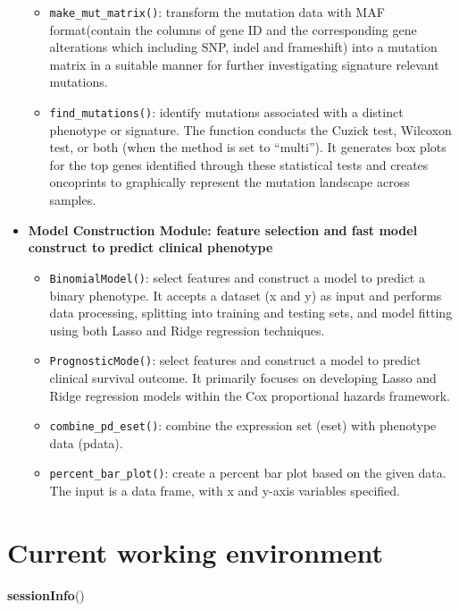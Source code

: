 \documentclass[
  12pt,
]{book}
\newenvironment{Shaded}{\begin{snugshade}}{\end{snugshade}}
\newcommand{\FunctionTok}[1]{\textcolor[rgb]{0.13,0.29,0.53}{\textbf{#1}}}
\newcommand{\NormalTok}[1]{#1}
\providecommand{\tightlist}{%
  \setlength{\itemsep}{0pt}\setlength{\parskip}{0pt}}
\begin{document}
\begin{itemize}
  \begin{itemize}
  \tightlist
  \item
    \texttt{make\_mut\_matrix()}: transform the mutation data with MAF format(contain the columns of gene ID and the corresponding gene alterations which including SNP, indel and frameshift) into a mutation matrix in a suitable manner for further investigating signature relevant mutations.
  \item
    \texttt{find\_mutations()}: identify mutations associated with a distinct phenotype or signature. The function conducts the Cuzick test, Wilcoxon test, or both (when the method is set to ``multi''). It generates box plots for the top genes identified through these statistical tests and creates oncoprints to graphically represent the mutation landscape across samples.
  \end{itemize}
\item
  \textbf{Model Construction Module: feature selection and fast model construct to predict clinical phenotype}

  \begin{itemize}
  \tightlist
  \item
    \texttt{BinomialModel()}: select features and construct a model to predict a binary phenotype. It accepts a dataset (x and y) as input and performs data processing, splitting into training and testing sets, and model fitting using both Lasso and Ridge regression techniques.
  \item
    \texttt{PrognosticMode()}: select features and construct a model to predict clinical survival outcome. It primarily focuses on developing Lasso and Ridge regression models within the Cox proportional hazards framework.
  \item
    \texttt{combine\_pd\_eset()}: combine the expression set (eset) with phenotype data (pdata).
  \item
    \texttt{percent\_bar\_plot()}: create a percent bar plot based on the given data. The input is a data frame, with x and y-axis variables specified.
  \end{itemize}
\end{itemize}

\hypertarget{current-working-environment}{%
\section{Current working environment}\label{current-working-environment}}

\begin{Shaded}
\begin{Highlighting}[]
\FunctionTok{sessionInfo}\NormalTok{()}
\end{Highlighting}
\end{Shaded}
\end{document}
